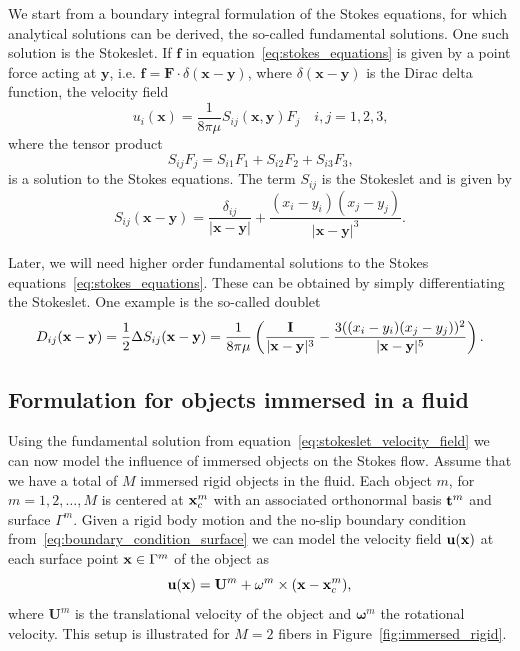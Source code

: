 We start from a boundary integral formulation of the Stokes equations, for which analytical solutions can be derived, the so-called fundamental solutions. One such solution is the Stokeslet. If $\mathbf{f}$ in equation~\eqref{eq:stokes_equations} is given by a point force acting at $\mathbf{y}$, i.e. $\mathbf{f} = \mathbf{F} \cdot \delta(\mathbf{x} - \mathbf{y})$, where $\delta(\mathbf{x} - \mathbf{y})$ is the Dirac delta function, the velocity field
\begin{equation}
  \label{eq:stokeslet_velocity_field}
  u_i(\mathbf{x}) = \frac{1}{8\pi\mu}S_{ij}(\mathbf{x},\mathbf{y})F_j \quad i,j=1,2,3 \text{,}
\end{equation}
where the tensor product
\begin{equation}
  \label{eq:stokeslet_tensor_product}
  S_{ij}F_j = S_{i1}F_1 + S_{i2}F_2 + S_{i3}F_3 \text{,}
\end{equation}
is a solution to the Stokes equations. The term $S_{ij}$ is the Stokeslet and is given by
\begin{equation}
  \label{eq:stokeslet_stokeslet}
  S_{ij}(\mathbf{x} - \mathbf{y}) = \frac{\delta_{ij}}{|\mathbf{x}-\mathbf{y}|} + \frac{(x_i - y_i)(x_j-y_j)}{|\mathbf{x}-\mathbf{y}|^3}\text{.}
\end{equation}

Later, we will need higher order fundamental solutions to the Stokes equations~\eqref{eq:stokes_equations}. These can be obtained by simply differentiating the Stokeslet. One example is the so-called doublet
\begin{equation}
  \label{eq:doublet}
  D_{ij}(\mathbf{x} - \mathbf{y}) = \frac{1}{2} \Delta S_{ij}(\mathbf{x} - \mathbf{y}) = \frac{1}{8\pi\mu} \left( \frac{\mathbf{I}}{|\mathbf{x} - \mathbf{y}|^3} - \frac{3((x_i - y_i)(x_j-y_j))^2}{|\mathbf{x} - \mathbf{y}|^5}\right) \text{.}
\end{equation}

\subsection{Formulation for objects immersed in a fluid}
\label{subsec:formulation_objects_in_fluid}

Using the fundamental solution from equation~\eqref{eq:stokeslet_velocity_field} we can now model the influence of immersed objects on the Stokes flow. Assume that we have a total of $M$ immersed rigid objects in the fluid. Each object $m$, for $m = 1,2,\dots,M$ is centered at $\mathbf{x}_c^m$ with an associated orthonormal basis $\mathbf{t}^m$ and surface $\Gamma^m$. Given a rigid body motion and the no-slip boundary condition from~\eqref{eq:boundary_condition_surface} we can model the velocity field $\mathbf{u}(\mathbf{x})$ at each surface point $\mathbf{x} \in \Gamma^m$ of the object as
\begin{equation}
  \label{eq:rigid_body_motion}
	\mathbf{u}(\mathbf{x}) = \mathbf{U}^m + \mathbf{\omega}^m \times (\mathbf{x} - \mathbf{x}_c^m) \text{,}
\end{equation}
where $\mathbf{U}^m$ is the translational velocity of the object and $\mathbf{\omega}^m$ the rotational velocity. This setup is illustrated for $M=2$ fibers in Figure~\ref{fig:immersed_rigid}.

